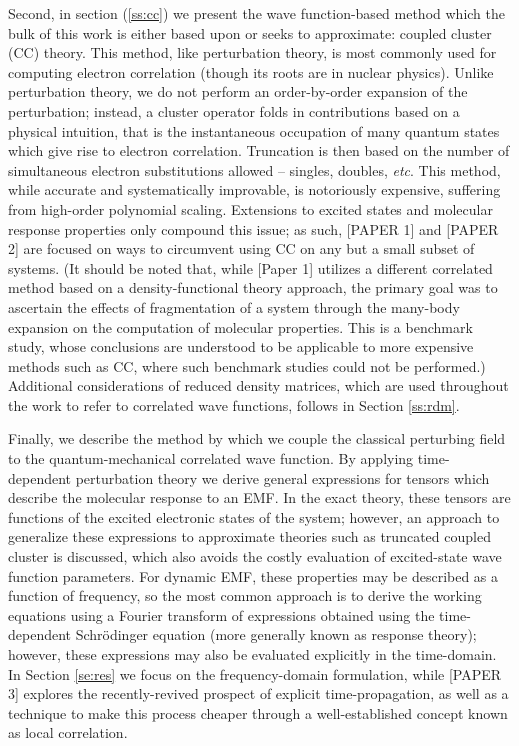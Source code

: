 Second, in section (\ref{ss:cc}) we present the wave
function-based method which the bulk of this work is either
based upon or seeks to approximate: coupled cluster (CC) theory.
\cite{Sinanoglu1964,Cizek1966,Cizek1969,Crawford2000} This method,
like perturbation theory, is most commonly used for computing electron
correlation (though its roots are in nuclear physics).  Unlike perturbation
theory, we do not perform an order-by-order expansion of the perturbation;
instead, a cluster operator folds in contributions based on a physical
intuition, that is the instantaneous occupation of many quantum states
which give rise to electron correlation. Truncation is then based on the
number of simultaneous electron substitutions allowed -- singles, doubles, \textit{etc}.
This
method, while accurate and systematically improvable, is notoriously
expensive, suffering from high-order polynomial scaling. Extensions to
excited states and molecular response properties only compound this issue;
\cite{Hoodbhoy1979,Crawford2006,Helgaker2012,Crawford2019} as such, [PAPER 1]
and [PAPER 2] are focused on ways to circumvent using CC on any but a small
subset of systems. (It should be noted that, while [Paper 1] utilizes a
different correlated method based on a density-functional theory approach,
the primary goal was to ascertain the effects of fragmentation of a system
through the many-body expansion on the computation of molecular properties.
This is a benchmark study, whose conclusions are understood to be applicable
to more expensive methods such as CC, where such benchmark studies could
not be performed.)  Additional considerations of reduced density matrices,
\cite{RDM1976,Harris1992,pinkbook} which are used throughout the work to
refer to correlated wave functions, follows in Section \ref{ss:rdm}.

Finally, we describe the method by which we couple the classical perturbing field to the 
quantum-mechanical correlated wave function. 
By applying time-dependent perturbation theory\cite{Langhoff} 
we derive general expressions for tensors which describe 
the molecular response to an EMF. In the exact theory, these tensors are functions of the 
excited electronic states of the system; however, an approach to generalize 
these expressions to approximate theories such as truncated coupled cluster is discussed,
\cite{Koch1990,Pedersen1997,Christiansen1998,Norman2011}
which also avoids the costly evaluation of excited-state wave function parameters. 
For dynamic EMF, these properties may be 
described as a function of frequency, so the most common approach is to derive the working equations
using a Fourier transform of expressions obtained using the time-dependent Schr\"odinger equation 
(more generally known as response theory); however, these expressions may also be evaluated explicitly
in the time-domain.
\cite{Goings2018,Li2020}
In Section \ref{se:res} we focus on the frequency-domain formulation, while
[PAPER 3] explores the recently-revived prospect of explicit time-propagation, as well as a 
technique to make this process cheaper through a well-established concept known as 
local correlation.\cite{Werner2006} 
